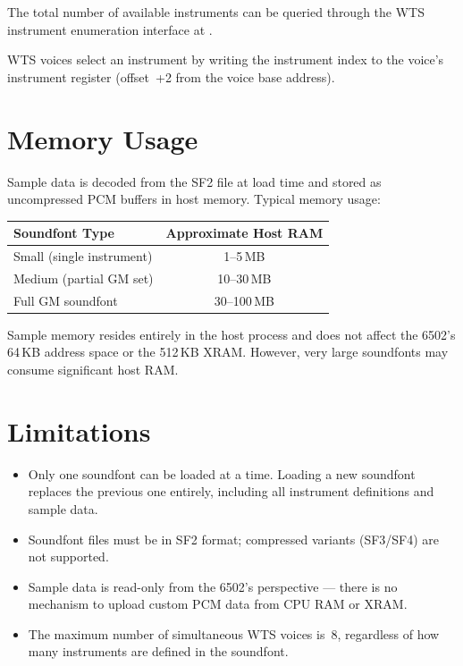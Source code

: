 The total number of available instruments can be queried through the WTS
instrument enumeration interface at .

WTS voices select an instrument by writing the instrument index to the voice's
instrument register (offset~+2 from the voice base address).


\section{Memory Usage}
\label{sec:wts-memory}

Sample data is decoded from the SF2 file at load time and stored as uncompressed
PCM buffers in host memory.  Typical memory usage:

\begin{center}
\small
\begin{tabular}{@{}lc@{}}
\toprule
\textbf{Soundfont Type} & \textbf{Approximate Host RAM} \\
\midrule
Small (single instrument)  & 1--5\,MB \\
Medium (partial GM set)    & 10--30\,MB \\
Full GM soundfont          & 30--100\,MB \\
\bottomrule
\end{tabular}
\end{center}

\begin{warningbox}
Sample memory resides entirely in the host process and does not affect the
6502's 64\,KB address space or the 512\,KB XRAM.  However, very large soundfonts
may consume significant host RAM.
\end{warningbox}


\section{Limitations}
\label{sec:wts-limits}

\begin{itemize}
  \item Only one soundfont can be loaded at a time.  Loading a new soundfont
        replaces the previous one entirely, including all instrument definitions
        and sample data.
  \item Soundfont files must be in SF2 format; compressed variants (SF3/SF4) are
        not supported.
  \item Sample data is read-only from the 6502's perspective --- there is no
        mechanism to upload custom PCM data from CPU RAM or XRAM.
  \item The maximum number of simultaneous WTS voices is~8, regardless of how
        many instruments are defined in the soundfont.
\end{itemize}
